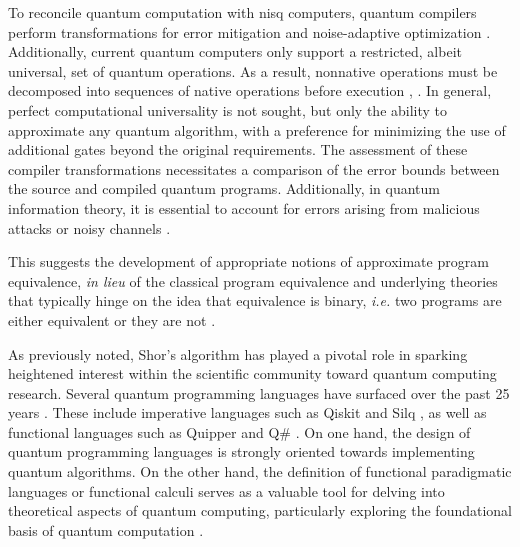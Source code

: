 To reconcile quantum computation with \acrshort{nisq} computers, quantum compilers perform transformations for error mitigation \cite{wallman2016noise} and noise-adaptive optimization \cite{murali2019noise}. Additionally, current quantum computers only support a restricted, albeit universal, set of quantum operations. As a result, nonnative operations must be decomposed into sequences of native operations before execution \cite{harrow2002efficient}, \cite{burgholzer2020advanced}. In general, perfect computational universality is not sought, but only the ability to approximate any quantum algorithm, with a preference for minimizing the use of additional gates beyond the original requirements. The assessment of these compiler transformations necessitates a comparison of the error bounds between the source and compiled quantum programs. Additionally, in quantum information theory, it is essential to account for errors arising from malicious attacks or noisy channels \cite{watrous2018theory}. 

This suggests the development of appropriate notions of approximate program equivalence, \textit {in lieu} of the classical program equivalence and underlying theories that typically hinge on the idea that equivalence is binary, \textit{i.e.} two programs are either equivalent or they are not \cite{winskel1993formal}.


As previously noted, Shor's algorithm has played a pivotal role in sparking heightened interest within the scientific community toward quantum computing research. Several quantum programming languages have surfaced over the past 25 years \cite{zhao2020quantum,serrano2022quantum}. These include imperative languages such as Qiskit \cite{Qiskit} and Silq \cite{bichsel2020silq}, as well as functional languages such as Quipper \cite{green2013quipper} and Q\# \cite{svore2018q}. On one hand, the design of quantum programming languages is strongly oriented towards implementing quantum algorithms. On the other hand, the  definition of functional paradigmatic languages or functional calculi serves as a valuable tool for delving into theoretical aspects of quantum computing, particularly exploring the foundational basis of quantum computation \cite{zorzi2016quantum}. 


